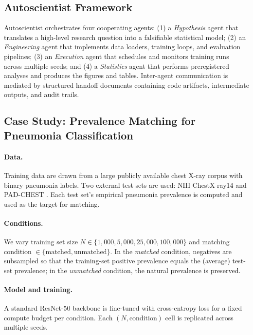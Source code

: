 \documentclass[11pt]{article}
\begin{document}
\subsection{Autoscientist Framework}
Autoscientist orchestrates four cooperating agents: (1) a \emph{Hypothesis} agent that translates a high-level research question into a falsifiable statistical model; (2) an \emph{Engineering} agent that implements data loaders, training loops, and evaluation pipelines; (3) an \emph{Execution} agent that schedules and monitors training runs across multiple seeds; and (4) a \emph{Statistics} agent that performs preregistered analyses and produces the figures and tables. Inter-agent communication is mediated by structured handoff documents containing code artifacts, intermediate outputs, and audit trails.

\subsection{Case Study: Prevalence Matching for Pneumonia Classification}
\paragraph{Data.} Training data are drawn from a large publicly available chest X-ray corpus with binary pneumonia labels. Two external test sets are used: NIH ChestX-ray14 \cite{wang2017chestxray} and PAD-CHEST \cite{bustos2020padchest}. Each test set's empirical pneumonia prevalence is computed and used as the target for matching.

\paragraph{Conditions.} We vary training set size $N \in \{1{,}000, 5{,}000, 25{,}000, 100{,}000\}$ and matching condition $\in \{\text{matched}, \text{unmatched}\}$. In the \emph{matched} condition, negatives are subsampled so that the training-set positive prevalence equals the (average) test-set prevalence; in the \emph{unmatched} condition, the natural prevalence is preserved.

\paragraph{Model and training.} A standard ResNet-50 backbone is fine-tuned with cross-entropy loss for a fixed compute budget per condition. Each $(N, \text{condition})$ cell is replicated across multiple seeds.
\end{document}
